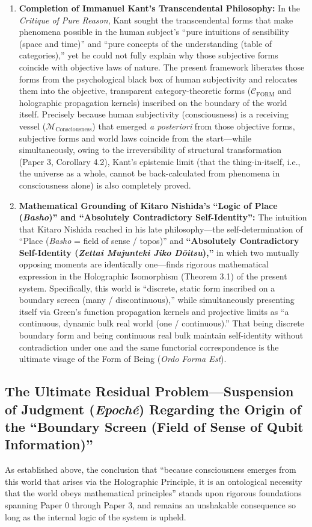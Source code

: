 \documentclass[11pt,a4paper]{article}
\theoremstyle{definition}
\theoremstyle{plain}
\begin{document}
\begin{enumerate}
    \item \textbf{Completion of Immanuel Kant's Transcendental Philosophy:}
    In the \textit{Critique of Pure Reason}, Kant sought the transcendental forms that make phenomena possible in the human subject's ``pure intuitions of sensibility (space and time)'' and ``pure concepts of the understanding (table of categories),'' yet he could not fully explain why those subjective forms coincide with objective laws of nature. The present framework liberates those forms from the psychological black box of human subjectivity and relocates them into the objective, transparent category-theoretic forms ($\mathcal{C}_{\mathrm{FORM}}$ and holographic propagation kernels) inscribed on the boundary of the world itself. Precisely because human subjectivity (consciousness) is a receiving vessel ($\mathcal{M}_{\mathrm{Consciousness}}$) that emerged \textit{a posteriori} from those objective forms, subjective forms and world laws coincide from the start---while simultaneously, owing to the irreversibility of structural transformation (Paper 3, Corollary 4.2), Kant's epistemic limit (that the thing-in-itself, i.e., the universe as a whole, cannot be back-calculated from phenomena in consciousness alone) is also completely proved.
    \item \textbf{Mathematical Grounding of Kitaro Nishida's ``Logic of Place (\textit{Basho})'' and ``Absolutely Contradictory Self-Identity'':}
    The intuition that Kitaro Nishida reached in his late philosophy---the self-determination of ``Place (\textit{Basho} = field of sense / topos)'' and \textbf{``Absolutely Contradictory Self-Identity (\textit{Zettai Mujunteki Jiko D\=oitsu}),''} in which two mutually opposing moments are identically one---finds rigorous mathematical expression in the Holographic Isomorphism (Theorem 3.1) of the present system. Specifically, this world is ``discrete, static form inscribed on a boundary screen (many / discontinuous),'' while simultaneously presenting itself via Green's function propagation kernels and projective limits as ``a continuous, dynamic bulk real world (one / continuous).'' That being discrete boundary form and being continuous real bulk maintain self-identity without contradiction under one and the same functorial correspondence is the ultimate visage of the Form of Being (\textit{Ordo Forma Est}).
\end{enumerate}

\subsection{The Ultimate Residual Problem---Suspension of Judgment (\textit{Epoch\'e}) Regarding the Origin of the ``Boundary Screen (Field of Sense of Qubit Information)''}
As established above, the conclusion that ``because consciousness emerges from this world that arises via the Holographic Principle, it is an ontological necessity that the world obeys mathematical principles'' stands upon rigorous foundations spanning Paper 0 through Paper 3, and remains an unshakable consequence so long as the internal logic of the system is upheld.
\end{document}
